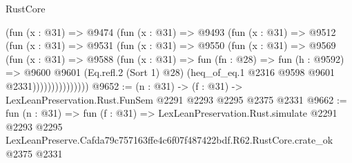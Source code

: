 \begin{lexlean}{RustCore}
\begin{coremodule}
                (fun (x : @31) =>
                @9474
                  (fun (x : @31) =>
                  @9493
                    (fun (x : @31) =>
                    @9512
                      (fun (x : @31) =>
                      @9531
                        (fun (x : @31) =>
                        @9550
                          (fun (x : @31) =>
                          @9569
                            (fun (x : @31) =>
                            @9588
                              (fun (x : @31) =>
                              fun (fn : @28) =>
                              fun (h : @9592) =>
                              @9600
                                @9601
                                (Eq.refl.{2} (Sort 1) @28)
                                (heq_of_eq.{1} @2316 @9598 @9601 @2331)))))))))))))))
@9652 := (n : @31) -> (f : @31) -> LexLeanPreservation.Rust.FunSem @2291 @2293 @2295 @2375 @2331
@9662 := fun (n : @31) =>
  fun (f : @31) =>
  LexLeanPreservation.Rust.simulate
    @2291
    @2293
    @2295
    LexLeanPreserve.Cafda79c757163ffe4c6f07f487422bdf.R62.RustCore.crate_ok
    @2375
    @2331
\end{coremodule}
\end{lexlean}
